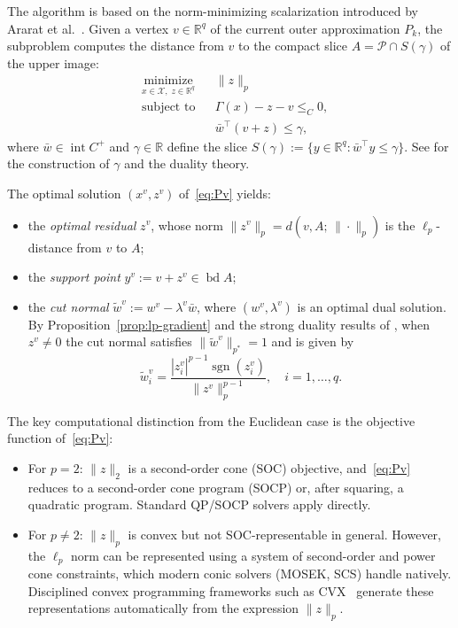 \documentclass[11pt]{article}
\newcommand{\R}{\mathbb{R}}
\newcommand{\pstar}{p^*}
\begin{document}
The algorithm is based on the norm-minimizing scalarization introduced by Ararat et al.\ \cite{Ararat2022}. Given a vertex $v \in \R^q$ of the current outer approximation $P_k$, the subproblem computes the distance from $v$ to the compact slice $A = \mathcal{P} \cap S(\gamma)$ of the upper image:
\begin{equation}\label{eq:Pv}\tag{P($v$)}
\begin{aligned}
& \underset{x \in \mathcal{X},\; z \in \R^q}{\text{minimize}} && \|z\|_p \\
& \text{subject to} && \Gamma(x) - z - v \le_C 0, \\
&&& \bar{w}^\top(v + z) \le \gamma,
\end{aligned}
\end{equation}
where $\bar{w} \in \operatorname{int} C^+$ and $\gamma \in \R$ define the slice $S(\gamma) := \{y \in \R^q : \bar{w}^\top y \le \gamma\}$. See \cite[Section~3]{Ararat2024} for the construction of $\gamma$ and the duality theory.

The optimal solution $(x^v, z^v)$ of~\eqref{eq:Pv} yields:
\begin{itemize}
\item the \emph{optimal residual} $z^v$, whose norm $\|z^v\|_p = d(v, A;\, \|\cdot\|_p)$ is the $\ell_p$-distance from $v$ to $A$;
\item the \emph{support point} $y^v := v + z^v \in \operatorname{bd} A$;
\item the \emph{cut normal} $\tilde{w}^v := w^v - \lambda^v \bar{w}$, where $(w^v, \lambda^v)$ is an optimal dual solution. By Proposition~\ref{prop:lp-gradient} and the strong duality results of \cite[Section~3]{Ararat2024}, when $z^v \neq 0$ the cut normal satisfies $\|\tilde{w}^v\|_{\pstar} = 1$ and is given by
\begin{equation}\label{eq:cut-normal}
\tilde{w}^v_i = \frac{|z^v_i|^{p-1} \operatorname{sgn}(z^v_i)}{\|z^v\|_p^{p-1}}, \quad i = 1, \ldots, q.
\end{equation}
\end{itemize}

The key computational distinction from the Euclidean case is the objective function of~\eqref{eq:Pv}:
\begin{itemize}
\item For $p = 2$: $\|z\|_2$ is a second-order cone (SOC) objective, and~\eqref{eq:Pv} reduces to a second-order cone program (SOCP) or, after squaring, a quadratic program. Standard QP/SOCP solvers apply directly.
\item For $p \neq 2$: $\|z\|_p$ is convex but not SOC-representable in general. However, the $\ell_p$ norm can be represented using a system of second-order and power cone constraints, which modern conic solvers (MOSEK, SCS) handle natively. Disciplined convex programming frameworks such as CVX~\cite{cvx} generate these representations automatically from the expression $\|z\|_p$.
\end{itemize}
\end{document}
